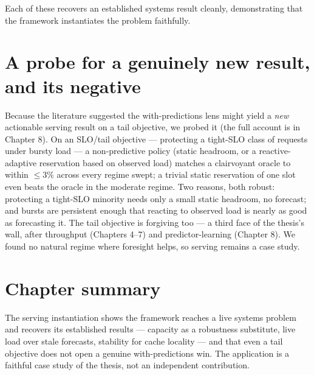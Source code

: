 Each of these recovers an established systems result cleanly, demonstrating that the
framework instantiates the problem faithfully.

\section{A probe for a genuinely new result, and its negative}\label{a-probe-for-a-genuinely-new-result-and-its-negative}

Because the literature suggested the with-predictions lens might yield a \emph{new} actionable
serving result on a tail objective, we probed it (the full account is in Chapter 8). On an
SLO/tail objective --- protecting a tight-SLO class of requests under bursty load --- a
non-predictive policy (static headroom, or a reactive-adaptive reservation based on observed
load) matches a clairvoyant oracle to within \(\le 3\%\) across every regime swept; a trivial
static reservation of one slot even beats the oracle in the moderate regime. Two reasons,
both robust: protecting a tight-SLO minority needs only a small static headroom, no forecast;
and bursts are persistent enough that reacting to observed load is nearly as good as
forecasting it. The tail objective is forgiving too --- a third face of the thesis's wall,
after throughput (Chapters 4--7) and predictor-learning (Chapter 8). We found no natural
regime where foresight helps, so serving remains a case study.

\section{Chapter summary}\label{chapter-summary}

The serving instantiation shows the framework reaches a live systems problem and recovers its
established results --- capacity as a robustness substitute, live load over stale forecasts,
stability for cache locality --- and that even a tail objective does not open a genuine
with-predictions win. The application is a faithful case study of the thesis, not an
independent contribution.
